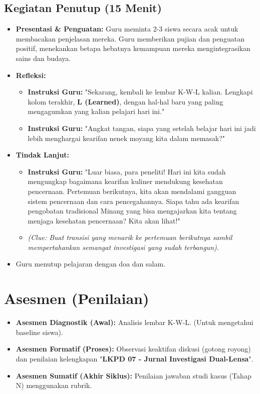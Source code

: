 \documentclass[a4paper,12pt]{article}
\begin{document}
\subsection{Kegiatan Penutup (15 Menit)}
\begin{itemize}
\item \textbf{Presentasi \& Penguatan:} Guru meminta 2-3 siswa secara acak untuk membacakan penjelasan mereka. Guru memberikan pujian dan penguatan positif, menekankan betapa hebatnya kemampuan mereka mengintegrasikan sains dan budaya.
\item \textbf{Refleksi:}
    \begin{itemize}
    \item \textbf{Instruksi Guru:} "Sekarang, kembali ke lembar K-W-L kalian. Lengkapi kolom terakhir, \textbf{L (Learned)}, dengan hal-hal baru yang paling mengagumkan yang kalian pelajari hari ini."
    \item \textbf{Instruksi Guru:} "Angkat tangan, siapa yang setelah belajar hari ini jadi lebih menghargai kearifan nenek moyang kita dalam memasak?"
    \end{itemize}
\item \textbf{Tindak Lanjut:}
    \begin{itemize}
    \item \textbf{Instruksi Guru:} "Luar biasa, para peneliti! Hari ini kita sudah mengungkap bagaimana kearifan kuliner mendukung kesehatan pencernaan. Pertemuan berikutnya, kita akan mendalami gangguan sistem pencernaan dan cara pencegahannya. Siapa tahu ada kearifan pengobatan tradisional Minang yang bisa mengajarkan kita tentang menjaga kesehatan pencernaan? Kita akan lihat!"
    \item \textit{(Clue: Buat transisi yang menarik ke pertemuan berikutnya sambil mempertahankan semangat investigasi yang sudah terbangun).}
    \end{itemize}
\item Guru menutup pelajaran dengan doa dan salam.
\end{itemize}

\section{Asesmen (Penilaian)}

\begin{itemize}
\item \textbf{Asesmen Diagnostik (Awal):} Analisis lembar K-W-L. (Untuk mengetahui baseline siswa).
\item \textbf{Asesmen Formatif (Proses):} Observasi keaktifan diskusi (gotong royong) dan penilaian kelengkapan "\textbf{LKPD 07 - Jurnal Investigasi Dual-Lensa}".
\item \textbf{Asesmen Sumatif (Akhir Siklus):} Penilaian jawaban studi kasus (Tahap N) menggunakan rubrik.
\end{itemize}
\end{document}
